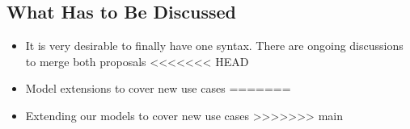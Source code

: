 \documentclass[11pt,a4paper]{ivoa}
\begin{document}
\subsection{What Has to Be Discussed}

\begin{itemize}
\item It is very desirable to finally have one syntax. There are ongoing discussions to merge both proposals 
<<<<<<< HEAD
\item Model extensions to cover new use cases
=======
\item Extending our models to cover new use cases
>>>>>>> main
\end{itemize}
\end{document}
